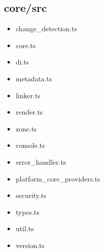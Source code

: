 \subsection{core/src}


\begin{itemize}
  \item change\_detection.ts
  \item core.ts
  \item di.ts
  \item metadata.ts
  \item linker.ts
  \item render.ts
  \item zone.ts
\end{itemize}








\begin{itemize}
  \item console.ts
  \item error\_handler.ts
  \item platform\_core\_providers.ts
  \item security.ts
  \item types.ts
  \item util.ts
  \item version.ts
\end{itemize}






